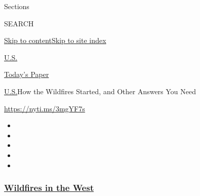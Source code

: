 Sections

SEARCH

\protect\hyperlink{site-content}{Skip to
content}\protect\hyperlink{site-index}{Skip to site index}

\href{https://www.nytimes3xbfgragh.onion/section/us}{U.S.}

\href{https://myaccount.nytimes3xbfgragh.onion/auth/login?response_type=cookie\&client_id=vi}{}

\href{https://www.nytimes3xbfgragh.onion/section/todayspaper}{Today's
Paper}

\href{/section/us}{U.S.}\textbar{}How the Wildfires Started, and Other
Answers You Need

\url{https://nyti.ms/3mgYF7s}

\begin{itemize}
\item
\item
\item
\item
\item
\end{itemize}

\hypertarget{wildfires-in-the-west}{%
\subsubsection{\texorpdfstring{\href{https://www.nytimes3xbfgragh.onion/spotlight/california-wildfires?name=styln-california-wildfires\&region=TOP_BANNER\&block=storyline_menu_recirc\&action=click\&pgtype=Article\&impression_id=ae3633f0-f52e-11ea-90d3-2f0ff35b997f\&variant=undefined}{Wildfires
in the West}}{Wildfires in the West}}\label{wildfires-in-the-west}}


